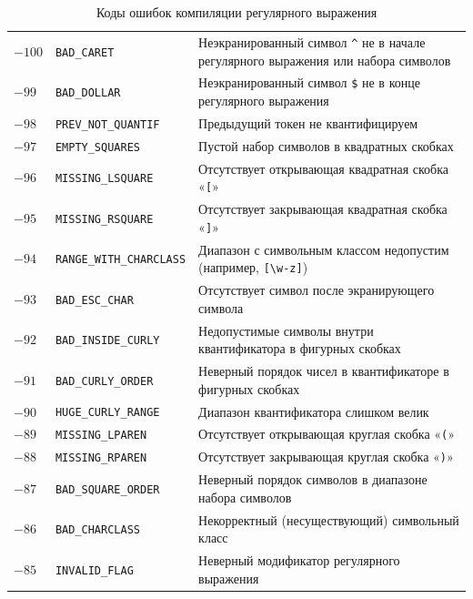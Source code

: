 \begin{xltabular}{\textwidth}{|C{2cm}|C{5cm}|T|}
	\caption{Коды ошибок компиляции регулярного выражения}
	\label{tab:errorcodes} \\
	\hline
	 &  &  \\
	\hline
	\finishhead
	$-100$ & \verb`BAD_CARET` & Неэкранированный символ \verb`^` не в начале регулярного выражения или набора символов \\
	\hline
	$-99$ & \verb`BAD_DOLLAR` & Неэкранированный символ \verb`$` не в конце регулярного выражения \\
	\hline
	$-98$ & \verb`PREV_NOT_QUANTIF` & Предыдущий токен не квантифицируем \\
	\hline
	$-97$ & \verb`EMPTY_SQUARES` & Пустой набор символов в квадратных скобках \\
	\hline
	$-96$ & \verb`MISSING_LSQUARE` & Отсутствует открывающая квадратная скобка «\verb`[`» \\
	\hline
	$-95$ & \verb`MISSING_RSQUARE` & Отсутствует закрывающая квадратная скобка «\verb`]`» \\
	\hline
	$-94$ & \verb`RANGE_WITH_CHARCLASS` & Диапазон с символьным классом недопустим (например, \verb`[\w-z]`) \\
	\hline
	$-93$ & \verb`BAD_ESC_CHAR` & Отсутствует символ после экранирующего символа \\
	\hline
	$-92$ & \verb`BAD_INSIDE_CURLY` & Недопустимые символы внутри квантификатора в фигурных скобках \\
	\hline
	$-91$ & \verb`BAD_CURLY_ORDER` & Неверный порядок чисел в квантификаторе в фигурных скобках \\
	\hline
	$-90$ & \verb`HUGE_CURLY_RANGE` & Диапазон квантификатора слишком велик \\
	\hline
	$-89$ & \verb`MISSING_LPAREN` & Отсутствует открывающая круглая скобка «\verb`(`» \\
	\hline
	$-88$ & \verb`MISSING_RPAREN` & Отсутствует закрывающая круглая скобка «\verb`)`» \\
	\hline
	$-87$ & \verb`BAD_SQUARE_ORDER` & Неверный порядок символов в диапазоне набора символов \\
	\hline
	$-86$ & \verb`BAD_CHARCLASS` & Некорректный (несуществующий) символьный класс \\
	\hline
	$-85$ & \verb`INVALID_FLAG` & Неверный модификатор регулярного выражения \\
	\hline
\end{xltabular}


